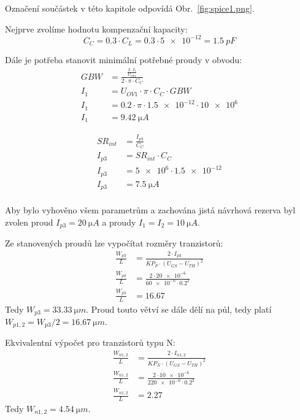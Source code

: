 Označení součástek v této kapitole odpovídá Obr.~\ref{fig:spice1.png}.

Nejprve zvolíme hodnotu kompenzační kapacity:
\[
    C_{C} = \num{0.3}\cdot C_{L} = \num{0.3}\cdot  \num{5e-12} = \qty{1.5}{pF}
\] 

Dále je potřeba stanovit minimální potřebné proudy v obvodu:
\begin{align*}
    GBW &= \frac{\frac{2\cdot I_{1} }{U_{OV1} }}{2\cdot \pi \cdot C_{C} } \\ 
    I_{1} &= U_{OV1}\cdot \pi \cdot C_{C} \cdot GBW \\ 
    I_{1} &= \num{0.2}\cdot \pi \cdot \num{1.5e-12} \cdot \num{10e6} \\ 
    I_{1} &= \qty{9.42}{\micro A}
\end{align*}

\begin{align*}
    SR_{int}  &= \frac{I_{p3}}{C_{C} } \\ 
    I_{p3} &= SR_{int}\cdot C_{C}  \\
    I_{p3} &= \num{5e6}\cdot \num{1.5e-12}  \\
    I_{p3} &= \qty{7.5}{\micro A}  \\
\end{align*}

    Aby bylo vyhověno všem parametrům a zachována jistá návrhová rezerva byl zvolen proud \(I_{p3} =\qty{20}{\micro A}\) a proudy \(I_{1}=I_{2}= \qty{10}{\micro A}  \).

    Ze stanovených proudů lze vypočítat rozměry tranzistorů:
    \begin{align*}
        \frac{W_{p3}}{L} &= \frac{2\cdot I_{p3}}{KP_{P}\cdot (U_{GS} -U_{TH})^2 } \\
        \frac{W_{p3}}{L} &= \frac{2\cdot \num{20e-6}}{\num{60e-6}\cdot \num{0.2}^2 } \\
        \frac{W_{p3}}{L} &= \num{16.67}
    \end{align*}
    Tedy \(W_{p3} = \qty{33.33}{\micro m}\). Proud touto větví se dále dělí na půl, tedy platí \(W_{p1,2} = W_{p3} /2 = \qty{16.67}{\micro m}\). 

    Ekvivalentní výpočet pro tranzistorů typu N:
    \begin{align*}
        \frac{W_{n1,2}}{L} &= \frac{2\cdot I_{n1,2}}{KP_{N}\cdot (U_{GS} -U_{TH})^2 } \\
        \frac{W_{n1,2}}{L} &= \frac{2\cdot \num{10e-6}}{\num{220e-6}\cdot \num{0.2}^2 } \\
        \frac{W_{n1,2}}{L} &= \num{2.27}
    \end{align*}
    Tedy \(W_{n1,2} = \qty{4.54}{\micro m}\).


